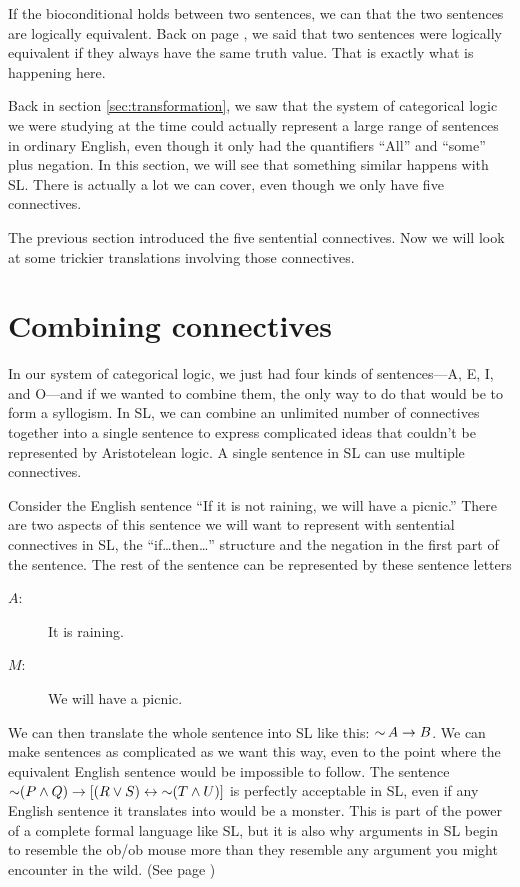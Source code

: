 If the bioconditional holds between two sentences, we can that the two sentences are logically equivalent. Back on page \pageref{def:logical_equivalence}, we said that two sentences were logically equivalent if they always  have the same truth value. That is exactly what is happening here.

Back in section \ref{sec:transformation}, we saw that the system of categorical logic we were studying at the time could actually represent a large range of sentences in ordinary English, even though it only had the quantifiers ``All'' and ``some'' plus negation. In this section, we will see that something similar happens with SL. There is actually a lot we can cover, even though we only have five connectives.

The previous section introduced the five sentential connectives. Now we will look at some trickier translations involving those connectives.

\section{Combining connectives}

In our system of categorical logic, we just had four kinds of sentences---A, E, I, and O---and if we wanted to combine them, the only way to do that would be to form a syllogism. In SL, we can combine an unlimited number of connectives together into a single sentence to express complicated ideas that couldn't be represented by Aristotelean logic. A single sentence in SL can use multiple connectives.

Consider the English sentence ``If it is not raining, we will have a picnic.'' There are two aspects of this sentence we will want to represent with sentential connectives in SL, the ``if\ldots then\ldots'' structure and the negation in the first part of the sentence. The rest of the sentence can be represented by these sentence letters

\begin{description}
\item[$A$:] It is raining.
\item[$M$:] We will have a picnic.
\end{description}

We can then translate the whole sentence into SL like this: $\mathop{\sim} A \mathrel{\rightarrow} B$. We can make sentences as complicated as we want this way, even to the point where the equivalent English sentence would be impossible to follow. The sentence $\mathop{\sim} (P \land Q) \mathrel{\rightarrow}  [(R \lor S) \mathrel{\leftrightarrow} \mathop{\sim} (T \land U)]$ is perfectly acceptable in SL, even if any English sentence it translates into would be a monster. This is part of the power of a complete formal language like SL, but it is also why arguments in SL begin to resemble the ob/ob mouse more than they resemble any argument you might encounter in the wild. (See page \pageref{fig:ob_ob_mouse})

